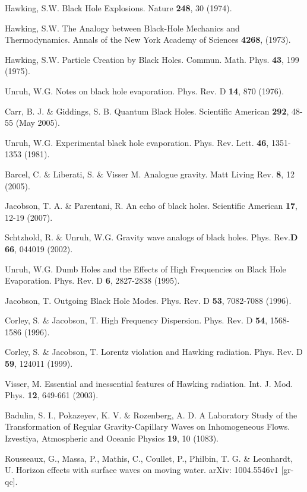 \documentclass[12pt,aps%
]{revtex4}
\begin{document}
\begin{thebibliography}{99}

Hawking, S.W. Black Hole Explosions.  Nature {\bf 248}, 30 (1974).

Hawking, S.W. The Analogy between Black-Hole Mechanics and Thermodynamics.
Annals of the New York Academy of Sciences {\bf 4268}, (1973).

Hawking, S.W. Particle Creation by Black Holes.  Commun. Math.
Phys. {\bf 43}, 199
(1975).

Unruh, W.G. Notes on black hole evaporation. Phys. Rev. D {\bf
14}, 870 (1976).

Carr, B. J. \& Giddings, S. B. Quantum Black Holes. Scientific
American {\bf 292},
48-55 (May 2005).

Unruh, W.G. Experimental black hole evaporation. Phys. Rev. Lett.
{\bf 46},
1351-1353 (1981).

Barcel, C. \& Liberati, S. \& Visser M. Analogue gravity. Matt
Living Rev. {\bf 8},
12 (2005).

Jacobson, T. A. \& Parentani, R. An echo of black holes. Scientific American
{\bf 17}, 12-19 (2007).

Schtzhold, R. \& Unruh, W.G. Gravity wave analogs of black holes.
Phys. Rev.{\bf D 66}, 044019 (2002).


Unruh, W.G. Dumb Holes and the Effects of High Frequencies on Black Hole
Evaporation. Phys. Rev. D {\bf 6}, 2827-2838 (1995).

 Jacobson, T. Outgoing Black Hole Modes. Phys. Rev. D {\bf 53}, 7082-7088 (1996).

 Corley, S. \& Jacobson, T. High Frequency Dispersion. Phys. Rev.
D {\bf 54},
1568-1586 (1996).

 Corley, S. \& Jacobson, T. Lorentz violation and Hawking radiation. Phys.
Rev. D {\bf 59}, 124011 (1999).

 Visser, M. Essential and inessential features of Hawking radiation. Int. J.
Mod. Phys. {\bf 12}, 649-661 (2003).

 Badulin, S. I., Pokazeyev, K. V. \& Rozenberg, A. D. A Laboratory Study of
the Transformation of Regular Gravity-Capillary Waves on Inhomogeneous Flows.
Izvestiya, Atmospheric and Oceanic Physics {\bf 19}, 10 (1083).

Rousseaux, G., Massa, P., Mathis, C., Coullet, P., Philbin, T. G. \&
Leonhardt, U. Horizon effects with surface waves on moving water. arXiv:
1004.5546v1 [gr-qc].


\end{thebibliography}
\end{document}
